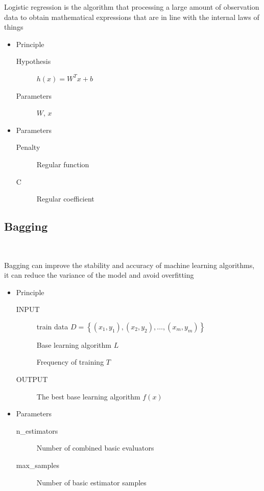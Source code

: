 Logistic regression is the algorithm that 
processing a large amount of 
observation data to 
obtain mathematical expressions 
that are in line with 
the internal laws of things

\begin{itemize}
	\item Principle
	
	\begin{description}
		\item[Hypothesis] $h(x)=W^{T} x+b$
		\item[Parameters] $ W$, $x$
	\end{description}
	
	\item Parameters
	
	\begin{description}
		\item[Penalty] Regular function
		\item[C] Regular coefficient
	\end{description}
	
\end{itemize}

\subsection{Bagging}
\

Bagging can improve the stability and accuracy 
of machine learning algorithms, 
it can reduce the variance of 
the model and avoid overfitting

\begin{itemize}
	\item Principle
	
	\begin{description}
		\item[INPUT] train data $ D = \left\{ 
		\left(x_1,y_1 \right), \left(x_2,y_2 \right),
		\dots,\left(x_m,y_m \right) \right\}$
		
		Base learning algorithm $L$
	
		Frequency of training $T$
		\item[OUTPUT] The best base learning algorithm $f(x)$
	
	\end{description}
	
	\item Parameters
	
	\begin{description}
		\item[n_estimators] Number of combined basic evaluators
		\item[max_samples] Number of basic estimator samples
	\end{description}
	
\end{itemize}

